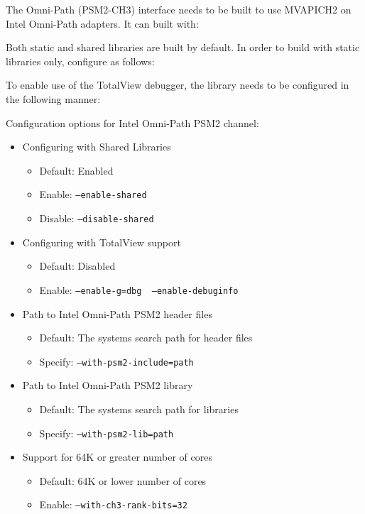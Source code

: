 The Omni-Path (PSM2-CH3) interface needs to be built to use MVAPICH2 on Intel
Omni-Path adapters. It can built with:


Both static and shared libraries are built by default. In order to build with static libraries only, configure as follows:


To enable use of the TotalView debugger, the library needs to be configured
in the following manner:


Configuration options for Intel Omni-Path PSM2 channel:

\begin{itemize}
	\item Configuring with Shared Libraries
		\begin{itemize}
			\item Default: Enabled
			\item Enable: \texttt{--enable-shared}
            \item Disable: \texttt{--disable-shared}
		\end{itemize}

	\item Configuring with TotalView support
		\begin{itemize}
			\item Default: Disabled
			\item Enable: \texttt{--enable-g=dbg \
                                   --enable-debuginfo}
		\end{itemize}

    \item{Path to Intel Omni-Path PSM2 header files}
    \begin{itemize}
        \item{Default: The systems search path for header files}
        \item{Specify: \texttt{--with-psm2-include=path}}
    \end{itemize}
    
    \item{Path to Intel Omni-Path PSM2 library}
    \begin{itemize}
        \item{Default: The systems search path for libraries}
        \item{Specify: \texttt{--with-psm2-lib=path}}
        \end{itemize}

	\item Support for 64K or greater number of cores
		\begin{itemize}
			\item Default: 64K or lower number of cores
			\item Enable: \texttt{--with-ch3-rank-bits=32}
		\end{itemize}
       \end{itemize}

